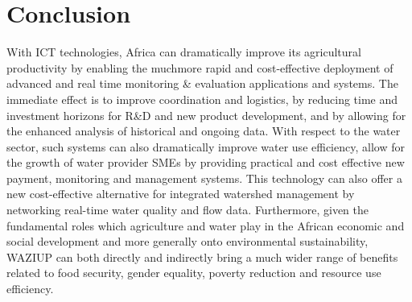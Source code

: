 
\section{Conclusion}
With ICT technologies, Africa can dramatically improve its agricultural productivity by enabling the muchmore rapid and cost-effective deployment of advanced and real time monitoring & evaluation applications and systems. 
The immediate effect is to improve coordination and logistics, by reducing time and investment horizons for R&D and new product development, and by allowing for the enhanced analysis of historical and ongoing data. 
With respect to the water sector, such systems can also dramatically improve water use efficiency, allow for the growth of water provider SMEs by providing practical and cost effective new payment, monitoring and management systems.
This technology can also offer a new cost-effective alternative for integrated watershed management by networking real-time water quality and flow data. 
Furthermore, given the fundamental roles which agriculture and water play in the African economic and social development and more generally onto environmental sustainability, WAZIUP can both directly and indirectly bring a much wider range of benefits related to food security, gender equality, poverty reduction and resource use efficiency.

